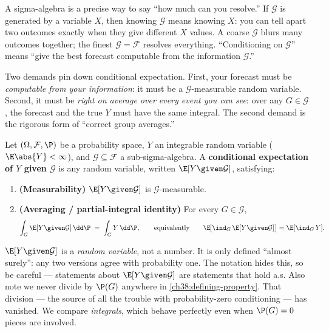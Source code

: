 \begin{intuitionbox}
A sigma-algebra is a precise way to say ``how much can you resolve.'' If $\mathcal{G}$ is generated
by a variable $X$, then knowing $\mathcal{G}$ means knowing $X$: you can tell apart two outcomes
exactly when they give different $X$ values. A coarse $\mathcal{G}$ blurs many outcomes together; the
finest $\mathcal{G} = \mathcal{F}$ resolves everything. ``Conditioning on $\mathcal{G}$'' means
``give the best forecast computable from the information $\mathcal{G}$.''
\end{intuitionbox}

Two demands pin down conditional expectation. First, your forecast must be \emph{computable from your
information}: it must be a $\mathcal{G}$-measurable random variable. Second, it must be \emph{right on
average over every event you can see}: over any $G \in \mathcal{G}$, the forecast and the true $Y$
must have the same integral. The second demand is the rigorous form of ``correct group averages.''

\begin{definition}
\label{ch38:def-cond-exp}
Let $(\Omega, \mathcal{F}, \P)$ be a probability space, $Y$ an integrable random variable
($\E\abs{Y} < \infty$), and $\mathcal{G} \subseteq \mathcal{F}$ a sub-sigma-algebra. A
\textbf{conditional expectation of $Y$ given $\mathcal{G}$} is any random variable, written
$\E[Y \given \mathcal{G}]$, satisfying:
\begin{enumerate}
  \item \textbf{(Measurability)} $\E[Y \given \mathcal{G}]$ is $\mathcal{G}$-measurable.
  \item \textbf{(Averaging / partial-integral identity)} For every $G \in \mathcal{G}$,
  \begin{equation}
  \label{ch38:defining-property}
    \int_G \E[Y \given \mathcal{G}] \,\dd\P \;=\; \int_G Y \,\dd\P,
    \qquad \text{equivalently} \qquad
    \E\!\big[\ind_G\,\E[Y\given\mathcal{G}]\big] = \E[\ind_G\, Y].
  \end{equation}
\end{enumerate}
\end{definition}

\begin{trapbox}
$\E[Y \given \mathcal{G}]$ is a \emph{random variable}, not a number. It is only defined ``almost
surely'': any two versions agree with probability one. The notation hides this, so be careful ---
statements about $\E[Y\given\mathcal{G}]$ are statements that hold a.s. Also note we never divide by
$\P(G)$ anywhere in \eqref{ch38:defining-property}. That division --- the source of all the trouble
with probability-zero conditioning --- has vanished. We compare \emph{integrals}, which behave
perfectly even when $\P(G) = 0$ pieces are involved.
\end{trapbox}

